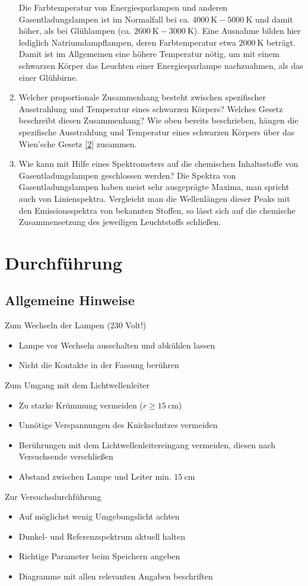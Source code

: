 \begin{enumerate}
		Die Farbtemperatur von Energiesparlampen und anderen Gasentladungslampen ist im Normalfall bei ca. $\SI{4000}{\kelvin}-\SI{5000}{\kelvin}$ und damit höher, als bei Glühlampen (ca. $\SI{2600}{\kelvin}-\SI{3000}{\kelvin}$). Eine Ausnahme bilden hier lediglich Natriumdampflampen, deren Farbtemperatur etwa $\SI{2000}{\kelvin}$ beträgt. Damit ist im Allgemeinen eine höhere Temperatur nötig, um mit einem schwarzen Körper das Leuchten einer Energiesparlampe nachzuahmen, als das einer Glühbirne.
	\item Welcher proportionale Zusammenhang besteht zwischen spezifischer Ausstrahlung und Temperatur eines schwarzen Körpers? Welches Gesetz beschreibt diesen Zusammenhang?
		\subitem Wie oben bereits beschrieben, hängen die spezifische Ausstrahlung und Temperatur eines schwarzen Körpers über das Wien'sche Gesetz \eqref{2} zusammen.
	\item Wie kann mit Hilfe eines Spektrometers auf die chemischen Inhaltsstoffe von Gasentladungslampen geschlossen werden?
		\subitem Die Spektra von Gasentladungslampen haben meist sehr ausgeprägte Maxima, man spricht auch von Linienspektra. Vergleicht man die Wellenlängen dieser Peaks mit den Emissionsspektra von bekannten Stoffen, so lässt sich auf die chemische Zusammensetzung des jeweiligen Leuchtstoffs schließen.
\end{enumerate}
\section{Durchführung}
\subsection{Allgemeine Hinweise}
Zum Wechseln der Lampen (230 Volt!)
\begin{itemize}
	\item Lampe vor Wechseln ausschalten und abkühlen lassen
	\item Nicht die Kontakte in der Fassung berühren
\end{itemize}
Zum Umgang mit dem Lichtwellenleiter
\begin{itemize}
	\item Zu starke Krümmung vermeiden ($r\geq\SI{15}{\centi\meter}$)
	\item Unnötige Verspannungen des Knickschutzes vermeiden
	\item Berührungen mit dem Lichtwellenleitereingang vermeiden, diesen nach Versuchsende verschließen
	\item Abstand zwischen Lampe und Leiter min. $\SI{15}{\centi\meter}$
\end{itemize}
Zur Versuchsdurchführung
\begin{itemize}
	\item Auf möglichst wenig Umgebungslicht achten
	\item Dunkel- und Referenzspektrum aktuell halten
	\item Richtige Parameter beim Speichern angeben
	\item Diagramme mit allen relevanten Angaben beschriften
\end{itemize}
